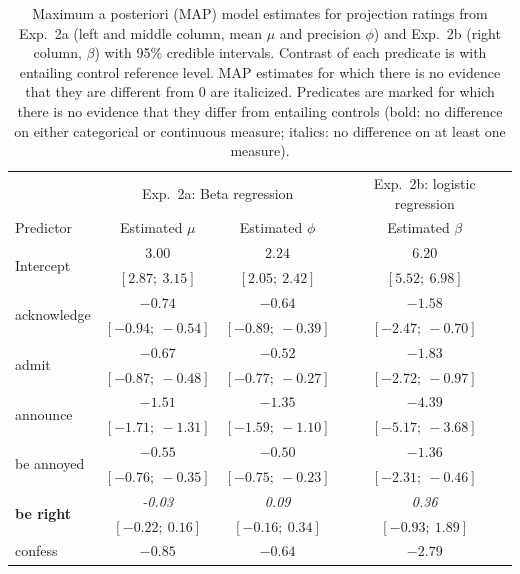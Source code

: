 \documentclass[11pt,fleqn]{article}
\newcommand{\6}{\mbox{$[\hspace*{-.6mm}[$}}
\newcommand{\9}{\mbox{$]\hspace*{-.6mm}]$}}
\begin{document}
\begin{table}
\caption{Maximum a posteriori (MAP) model estimates for projection ratings from Exp.~2a (left and middle column, mean $\mu$ and precision $\phi$) and Exp.~2b (right column, $\beta$)  with 95\% credible intervals. Contrast of each predicate is with entailing control reference level. MAP estimates for which there is no evidence that they are different from 0 are italicized. Predicates are marked for which there is no evidence that they differ from  entailing controls (bold: no difference on either categorical or continuous measure; italics: no difference on at least one measure).}
\small
\begin{center}
\begin{tabular}{l c c c}
\toprule
& \multicolumn{2}{c}{Exp.~2a: Beta regression} & Exp.~2b: logistic regression \\
Predictor & Estimated $\mu$ & Estimated $\phi$ & Estimated $\beta$\\
\midrule
\multirow{2}{*}{Intercept}            & $3.00$        & $2.24$        & $6.20$          \\
                        & $[2.87;\ 3.15]$   & $[2.05;\ 2.42]$   & $[5.52;\ 6.98]$     \\
\multirow{2}{*}{acknowledge}      & $-0.74$       & $-0.64$       & $-1.58$         \\
                        & $[-0.94;\ -0.54]$ & $[-0.89;\ -0.39]$ & $[-2.47;\ -0.70]$   \\
\multirow{2}{*}{admit}            & $-0.67$       & $-0.52$       & $-1.83$         \\
                        & $[-0.87;\ -0.48]$ & $[-0.77;\ -0.27]$ & $[-2.72;\ -0.97]$   \\
\multirow{2}{*}{announce}         & $-1.51$       & $-1.35$       & $-4.39$         \\
                        & $[-1.71;\ -1.31]$ & $[-1.59;\ -1.10]$ & $[-5.17;\ -3.68]$   \\
\multirow{2}{*}{be annoyed}      & $-0.55$       & $-0.50$       & $-1.36$         \\
                        & $[-0.76;\ -0.35]$ & $[-0.75;\ -0.23]$ & $[-2.31;\ -0.46]$   \\
\multirow{2}{*}{\textbf{be right}}        & \emph{-0.03}           & \emph{0.09}            & \emph{0.36}              \\
                        & $[-0.22;\ 0.16]$  & $[-0.16;\ 0.34]$  & $[-0.93;\ 1.89]$    \\
\multirow{2}{*}{confess}          & $-0.85$       & $-0.64$       & $-2.79$         \\

\end{tabular}
\end{center}
\end{table}
\end{document}
